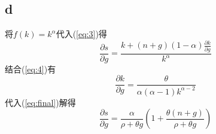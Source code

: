 \documentclass[a4paper,12pt]{ctexart}
\begin{document}
\subsection*{d}
将$f(k)=k^\alpha$代入(\ref{eq:3})得
\begin{equation}\label{eq:final}
    \frac{\partial s}{\partial g}=\frac{k+(n+g)(1-\alpha)\frac{\partial k}{\partial g}}{k^\alpha}
\end{equation}
结合(\ref{eq:4})有
\begin{equation*}
    \frac{\partial{k}}{\partial{g}}=\frac{\theta}{\alpha(\alpha-1)k^{\alpha-2}}
\end{equation*}
代入(\ref{eq:final})解得
\begin{equation}
    \frac{\partial s}{\partial g}=\frac{\alpha}{\rho+\theta g}\left(1+\frac{\theta(n+g)}{\rho+\theta g}\right)
\end{equation}
\end{document}

